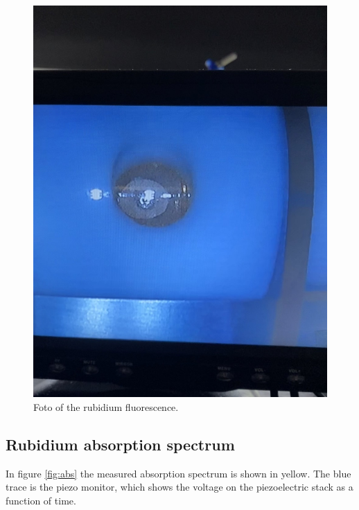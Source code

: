 \begin{figure}
    \centering
    \includegraphics[width=\textwidth]{fl.jpeg}
    \caption{Foto of the rubidium fluorescence.}
    \label{fig:ffl}
\end{figure}

\subsection{Rubidium absorption spectrum}
In figure \ref{fig:abs} the measured absorption spectrum is shown in yellow. The blue trace is the piezo
monitor, which shows the voltage on the piezoelectric stack as a function of time.

